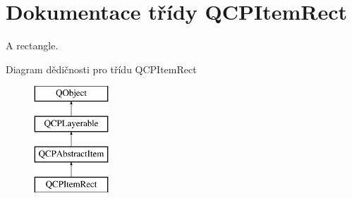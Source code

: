 \hypertarget{classQCPItemRect}{}\section{Dokumentace třídy Q\+C\+P\+Item\+Rect}
\label{classQCPItemRect}


A rectangle.  


Diagram dědičnosti pro třídu Q\+C\+P\+Item\+Rect\begin{figure}[H]
\begin{center}
\leavevmode
\includegraphics[height=4.000000cm]{classQCPItemRect}
\end{center}
\end{figure}
